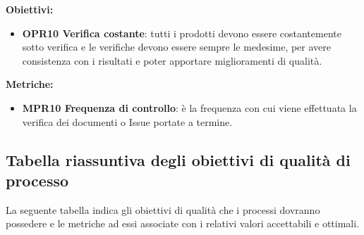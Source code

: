 \documentclass[../piano_di_qualifica.tex]{subfiles}
\begin{document}
\textbf{Obiettivi:}
\smallbreak
\begin{itemize}
	\item \textbf{OPR10 Verifica costante}: tutti i prodotti devono essere costantemente sotto verifica e le verifiche devono essere sempre le medesime, per avere consistenza con i risultati e poter apportare miglioramenti di qualità.
\end{itemize}

\textbf{Metriche:}
\smallbreak
\begin{itemize}
	\item \textbf{MPR10 Frequenza di controllo}: è la frequenza con cui viene effettuata la verifica dei documenti o Issue portate a termine.
\end{itemize}

\subsection{Tabella riassuntiva degli obiettivi di qualità di processo}
La seguente tabella indica gli obiettivi di qualità che i processi dovranno possedere e le metriche ad essi associate con i relativi valori accettabili e ottimali.
\end{document}
